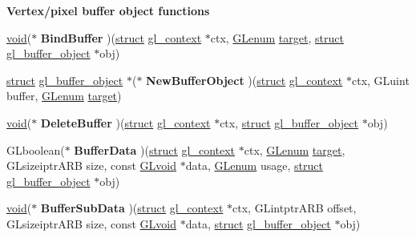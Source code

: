 \begin{Indent}\textbf{ Vertex/pixel buffer object functions}\par
\begin{DoxyCompactItemize}
\item 
\mbox{\label{structdd__function__table_ac95c0125661fb65eb7888bfd893dcba4}} 
\hyperlink{interfacevoid}{void}($\ast$ {\bfseries Bind\+Buffer} )(\hyperlink{interfacestruct}{struct} \hyperlink{structgl__context}{gl\+\_\+context} $\ast$ctx, \hyperlink{interfacevoid}{G\+Lenum} \hyperlink{interfacevoid}{target}, \hyperlink{interfacestruct}{struct} \hyperlink{structgl__buffer__object}{gl\+\_\+buffer\+\_\+object} $\ast$obj)
\item 
\mbox{\label{structdd__function__table_a97ed43bf9fdd1f61d02688b54712065a}} 
\hyperlink{interfacestruct}{struct} \hyperlink{structgl__buffer__object}{gl\+\_\+buffer\+\_\+object} $\ast$($\ast$ {\bfseries New\+Buffer\+Object} )(\hyperlink{interfacestruct}{struct} \hyperlink{structgl__context}{gl\+\_\+context} $\ast$ctx, G\+Luint buffer, \hyperlink{interfacevoid}{G\+Lenum} \hyperlink{interfacevoid}{target})
\item 
\mbox{\label{structdd__function__table_ae344aab5ace1142fd8e1d1d584eed52b}} 
\hyperlink{interfacevoid}{void}($\ast$ {\bfseries Delete\+Buffer} )(\hyperlink{interfacestruct}{struct} \hyperlink{structgl__context}{gl\+\_\+context} $\ast$ctx, \hyperlink{interfacestruct}{struct} \hyperlink{structgl__buffer__object}{gl\+\_\+buffer\+\_\+object} $\ast$obj)
\item 
\mbox{\label{structdd__function__table_a169c2aadf77bf88c53e9d921bfb542ff}} 
G\+Lboolean($\ast$ {\bfseries Buffer\+Data} )(\hyperlink{interfacestruct}{struct} \hyperlink{structgl__context}{gl\+\_\+context} $\ast$ctx, \hyperlink{interfacevoid}{G\+Lenum} \hyperlink{interfacevoid}{target}, G\+Lsizeiptr\+A\+RB size, const \hyperlink{interfacevoid}{G\+Lvoid} $\ast$data, \hyperlink{interfacevoid}{G\+Lenum} usage, \hyperlink{interfacestruct}{struct} \hyperlink{structgl__buffer__object}{gl\+\_\+buffer\+\_\+object} $\ast$obj)
\item 
\mbox{\label{structdd__function__table_a62501b7db965256fbbb5f3901519ccf7}} 
\hyperlink{interfacevoid}{void}($\ast$ {\bfseries Buffer\+Sub\+Data} )(\hyperlink{interfacestruct}{struct} \hyperlink{structgl__context}{gl\+\_\+context} $\ast$ctx, G\+Lintptr\+A\+RB offset, G\+Lsizeiptr\+A\+RB size, const \hyperlink{interfacevoid}{G\+Lvoid} $\ast$data, \hyperlink{interfacestruct}{struct} \hyperlink{structgl__buffer__object}{gl\+\_\+buffer\+\_\+object} $\ast$obj)

\end{DoxyCompactItemize}
\end{Indent}
